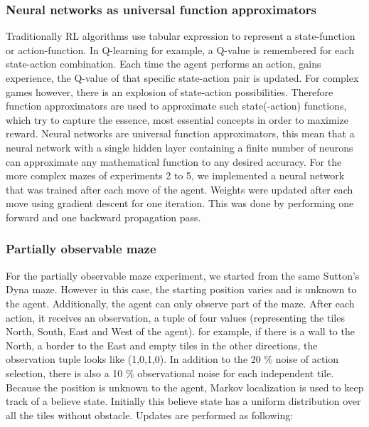 \documentclass[letterpaper]{article}
\begin{document}
\subsubsection{Neural networks as universal function
approximators}\label{neural-networks-as-universal-function-approximators}

Traditionally RL algorithms use tabular expression to represent a
state-function or action-function. In Q-learning for example, a Q-value
is remembered for each state-action combination. Each time the agent
performs an action, gains experience, the Q-value of that specific
state-action pair is updated. For complex games however, there is an
explosion of state-action possibilities. Therefore function
approximators are used to approximate such state(-action) functions,
which try to capture the essence, most essential concepts in order to
maximize reward. Neural networks are universal function approximators,
this mean that a neural network with a single hidden layer containing a
finite number of neurons can approximate any mathematical function to
any desired accuracy. For the more complex mazes of experiments 2 to 5,
we implemented a neural network that was trained after each move of the
agent. Weights were updated after each move using gradient descent for
one iteration. This was done by performing one forward and one backward
propagation pass.

\subsubsection{Partially observable
maze}\label{partially-observable-maze}

For the partially observable maze experiment, we started from the same
Sutton's Dyna maze. However in this case, the starting position varies
and is unknown to the agent. Additionally, the agent can only observe
part of the maze. After each action, it receives an observation, a tuple
of four values (representing the tiles North, South, East and West of
the agent). for example, if there is a wall to the North, a border to
the East and empty tiles in the other directions, the observation tuple
looks like (1,0,1,0). In addition to the 20 \% noise of action
selection, there is also a 10 \% observational noise for each
independent tile. Because the position is unknown to the agent, Markov
localization is used to keep track of a believe state. Initially this
believe state has a uniform distribution over all the tiles without
obstacle. Updates are performed as following:
\end{document}
